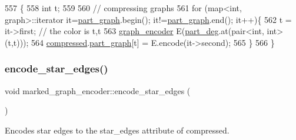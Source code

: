 \begin{DoxyCode}
557 \{
558   \textcolor{keywordtype}{int} t;
559 
560   \textcolor{comment}{// compressing graphs}
561   \textcolor{keywordflow}{for} (map<int, graph>::iterator it=\hyperlink{classmarked__graph__encoder_adbafd0769ae301acc1b2c19b5e1d4844}{part\_graph}.begin(); it!=\hyperlink{classmarked__graph__encoder_adbafd0769ae301acc1b2c19b5e1d4844}{part\_graph}.end(); it++)\{
562     t = it->first; \textcolor{comment}{// the color is t,t}
563     \hyperlink{classgraph__encoder}{graph\_encoder} E(\hyperlink{classmarked__graph__encoder_a55ea2edb2609dfc287432f61900d6ad1}{part\_deg}.at(pair<int, int>(t,t)));
564     \hyperlink{classmarked__graph__encoder_ac2ded200860fdd2321f86dd76b28bcb3}{compressed}.\hyperlink{classmarked__graph__compressed_ae179a4737e6eab905c18a94d44ef64b7}{part\_graph}[t] = E.encode(it->second);
565   \}
566 \}
\end{DoxyCode}
\mbox{\label{classmarked__graph__encoder_ad6883669a47d24e3d9898978f3252727}} 
\subsubsection{\texorpdfstring{encode\+\_\+star\+\_\+edges()}{encode\_star\_edges()}}
{\footnotesize\ttfamily void marked\+\_\+graph\+\_\+encoder\+::encode\+\_\+star\+\_\+edges (\begin{DoxyParamCaption}{ }\end{DoxyParamCaption})\hspace{0.3cm}{\ttfamily [private]}}



Encodes star edges to the star\+\_\+edges attribute of compressed. 


